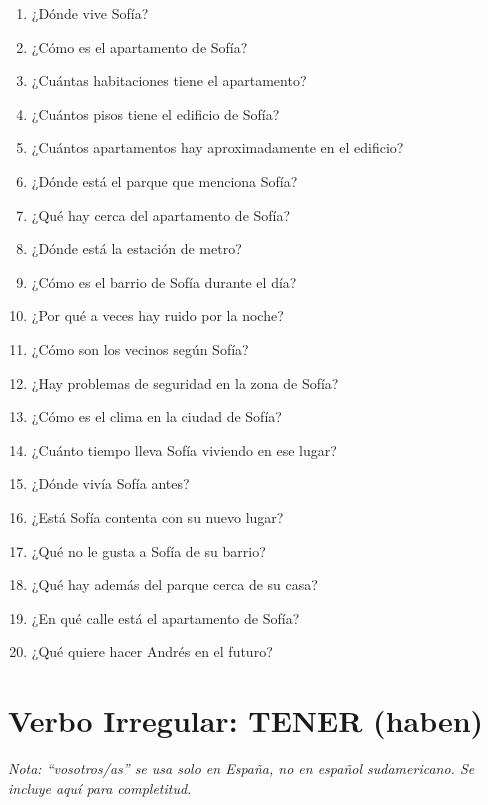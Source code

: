 \documentclass[12pt,a4paper]{article}
\begin{document}
\begin{enumerate}[leftmargin=*]
    \item ¿Dónde vive Sofía?
    \item ¿Cómo es el apartamento de Sofía?
    \item ¿Cuántas habitaciones tiene el apartamento?
    \item ¿Cuántos pisos tiene el edificio de Sofía?
    \item ¿Cuántos apartamentos hay aproximadamente en el edificio?
    \item ¿Dónde está el parque que menciona Sofía?
    \item ¿Qué hay cerca del apartamento de Sofía?
    \item ¿Dónde está la estación de metro?
    \item ¿Cómo es el barrio de Sofía durante el día?
    \item ¿Por qué a veces hay ruido por la noche?
    \item ¿Cómo son los vecinos según Sofía?
    \item ¿Hay problemas de seguridad en la zona de Sofía?
    \item ¿Cómo es el clima en la ciudad de Sofía?
    \item ¿Cuánto tiempo lleva Sofía viviendo en ese lugar?
    \item ¿Dónde vivía Sofía antes?
    \item ¿Está Sofía contenta con su nuevo lugar?
    \item ¿Qué no le gusta a Sofía de su barrio?
    \item ¿Qué hay además del parque cerca de su casa?
    \item ¿En qué calle está el apartamento de Sofía?
    \item ¿Qué quiere hacer Andrés en el futuro?
\end{enumerate}

\newpage

\section*{Verbo Irregular: TENER (haben)}

\textit{Nota: \enquote{vosotros/as} se usa solo en España, no en español sudamericano. Se incluye aquí para completitud.}
\end{document}
